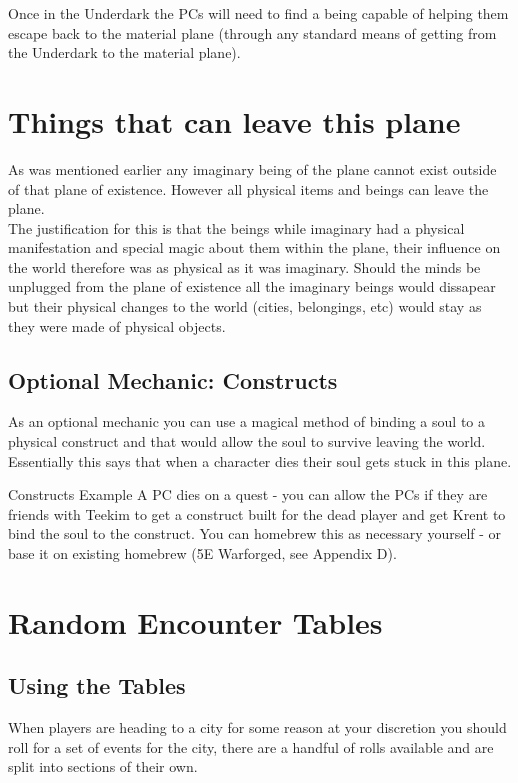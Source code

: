 \documentclass[10pt,twoside,twocolumn]{article}
\begin{document}
Once in the Underdark the PCs will need to find a being capable of helping them escape back to the material plane (through any standard means of getting from the Underdark to the material plane).\\

\section{Things that can leave this plane}
As was mentioned earlier any imaginary being of the plane cannot exist outside of that plane of existence. However all physical items and beings can leave the plane.\\

The justification for this is that the beings while imaginary had a physical manifestation and special magic about them within the plane, their influence on the world therefore was as physical as it was imaginary. Should the minds be unplugged from the plane of existence all the imaginary beings would dissapear but their physical changes to the world (cities, belongings, etc) would stay as they were made of physical objects.\\

\subsection{Optional Mechanic: Constructs}
As an optional mechanic you can use a magical method of binding a soul to a physical construct and that would allow the soul to survive leaving the world. Essentially this says that when a character dies their soul gets stuck in this plane.\\

\begin{paperbox}{Constructs Example}
A PC dies on a quest - you can allow the PCs if they are friends with Teekim to get a construct built for the dead player and get Krent to bind the soul to the construct. You can homebrew this as necessary yourself - or base it on existing homebrew (5E Warforged, see Appendix D).
\end{paperbox}

\section{Random Encounter Tables}

\subsection{Using the Tables}
When players are heading to a city for some reason at your discretion you should roll for a set of events for the city, there are a handful of rolls available and are split into sections of their own.\\
\end{document}
